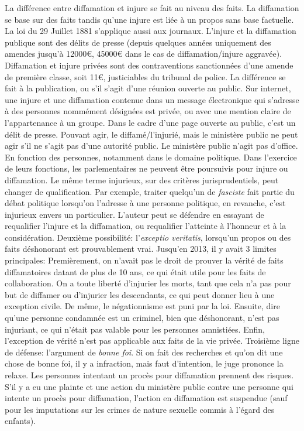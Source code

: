 \documentclass[math]{cours}
\begin{document}
\medskip

La différence entre diffamation et injure se fait au niveau des faits.
La diffamation se base sur des faits tandis qu'une injure est liée à un propos sans base factuelle.
La loi du 29 Juillet 1881 s'applique aussi aux journaux.
L'injure et la diffamation publique sont des délits de presse (depuis quelques années uniquement des amendes jusqu'à 12000€, 45000€ dans le cas de diffamation/injure aggravée).
Diffamation et injure privées sont des contraventions sanctionnées d'une amende de première classe, soit 11€, justiciables du tribunal de police.
La différence se fait à la publication, ou s'il s'agit d'une réunion ouverte au public.
Sur internet, une injure et une diffamation contenue dans un message électronique qui s'adresse à des personnes nommément désignées est privée, ou avec une mention claire de l'appartenance à un groupe.
Dans le cadre d'une page ouverte au public, c'est un délit de presse.
Pouvant agir, le diffamé/l'injurié, mais le ministère public ne peut agir s'il ne s'agit pas d'une autorité public.
Le ministère public n'agit pas d'office.
En fonction des personnes, notamment dans le domaine politique.
Dans l'exercice de leurs fonctions, les parlementaires ne peuvent être poursuivis pour injure ou diffamation.
Le même terme injurieux, sur des critères jurisprudentiels, peut changer de qualification.
Par exemple, traiter quelqu'un de \textit{fasciste} fait partie du débat politique lorsqu'on l'adresse à une personne politique, en revanche, c'est injurieux envers un particulier.
L'auteur peut se défendre en essayant de requalifier l'injure et la diffamation, ou requalifier l'atteinte à l'honneur et à la considération.
Deuxième possibilité: l'\textit{exceptio veritatis}, lorsqu'un propos ou des faits déshonorant est prouvablement vrai.
Jusqu'en 2013, il y avait 3 limites principales: Premièrement, on n'avait pas le droit de prouver la vérité de faits diffamatoires datant de plus de 10 ans, ce qui était utile pour les faits de collaboration.
On a toute liberté d'injurier les morts, tant que cela n'a pas pour but de diffamer ou d'injurier les descendants, ce qui peut donner lieu à une exception civile.
De même, le négationnisme est puni par la loi.
Ensuite, dire qu'une personne condamnée est un criminel, bien que déshonorant, n'est pas injuriant, ce qui n'était pas valable pour les personnes amnistiées.
Enfin, l'exception de vérité n'est pas applicable aux faits de la vie privée.
Troisième ligne de défense: l'argument de \textit{bonne foi}.
Si on fait des recherches et qu'on dit une chose de bonne foi, il y a infraction, mais faut d'intention, le juge prononce la relaxe.
Les personnes intentant un procès pour diffamation prennent des risques.
S'il y a eu une plainte et une action du ministère public contre une personne qui intente un procès pour diffamation, l'action en diffamation est suspendue (sauf pour les imputations sur les crimes de nature sexuelle commis à l'égard des enfants).
\end{document}
